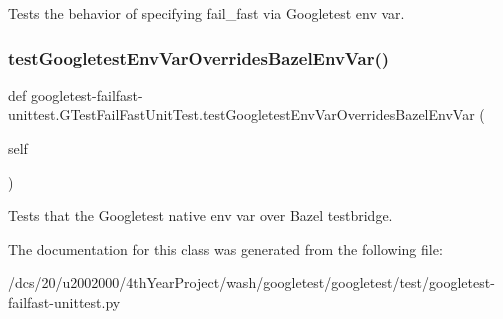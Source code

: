 \begin{DoxyVerb}Tests the behavior of specifying fail_fast via Googletest env var.\end{DoxyVerb}
 \mbox{\label{classgoogletest-failfast-unittest_1_1GTestFailFastUnitTest_ad998af915c456cda96a09816223585f5}} 
\subsubsection{\texorpdfstring{test\+Googletest\+Env\+Var\+Overrides\+Bazel\+Env\+Var()}{testGoogletestEnvVarOverridesBazelEnvVar()}}
{\footnotesize\ttfamily def googletest-\/failfast-\/unittest.\+G\+Test\+Fail\+Fast\+Unit\+Test.\+test\+Googletest\+Env\+Var\+Overrides\+Bazel\+Env\+Var (\begin{DoxyParamCaption}\item[{}]{self }\end{DoxyParamCaption})}

\begin{DoxyVerb}Tests that the Googletest native env var over Bazel testbridge.\end{DoxyVerb}
 

The documentation for this class was generated from the following file\+:\begin{DoxyCompactItemize}
\item 
/dcs/20/u2002000/4th\+Year\+Project/wash/googletest/googletest/test/googletest-\/failfast-\/unittest.\+py\end{DoxyCompactItemize}
